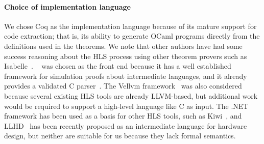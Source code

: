 

\paragraph{Choice of implementation language}

We chose Coq as the implementation language because of its mature support for
code extraction; that is, its ability to generate OCaml programs directly from
the definitions used in the theorems.  We note that other authors have had some
success reasoning about the HLS process using other theorem provers such as
Isabelle~\cite{ellis08_csicgfu}.
\compcert{}~\cite{leroy09_formal_verif_realis_compil} was chosen as the front
end because it has a well established framework for simulation proofs about
intermediate languages, and it already provides a validated C
parser~\cite{jourdan12_valid_lr_parser}.  The Vellvm
framework~\cite{zhao12_formal_llvm_inter_repres_verif_progr_trans} was also
considered because several existing HLS tools are already LLVM-based, but
additional work would be required to support a high-level language like C as
input.  The .NET framework has been used as a basis for other HLS tools, such as
Kiwi~\cite{greaves08_kiwi}, and LLHD~\cite{schuiki20_llhd} has been recently
proposed as an intermediate language for hardware design, but neither are
suitable for us because they lack formal semantics.

